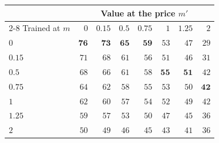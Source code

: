 \begin{tabular}{lrrrrrrr}
\toprule
 & \multicolumn{7}{c}{Value at the price $m'$} \\
\cmidrule(lr){2-8}
Trained at $m$ & $0$ & $0.15$ & $0.5$ & $0.75$ & $1$ & $1.25$ & $2$ \\
\midrule
$0$ & $\mathbf{76}$ & $\mathbf{73}$ & $\mathbf{65}$ & $\mathbf{59}$ & $53$ & $47$ & $29$ \\
$0.15$ & $71$ & $68$ & $61$ & $56$ & $51$ & $46$ & $31$ \\
$0.5$ & $68$ & $66$ & $61$ & $58$ & $\mathbf{55}$ & $\mathbf{51}$ & $42$ \\
$0.75$ & $64$ & $62$ & $58$ & $55$ & $53$ & $50$ & $\mathbf{42}$ \\
$1$ & $62$ & $60$ & $57$ & $54$ & $52$ & $49$ & $42$ \\
$1.25$ & $59$ & $57$ & $53$ & $50$ & $47$ & $45$ & $36$ \\
$2$ & $50$ & $49$ & $46$ & $45$ & $43$ & $41$ & $36$ \\
\bottomrule
\end{tabular}
